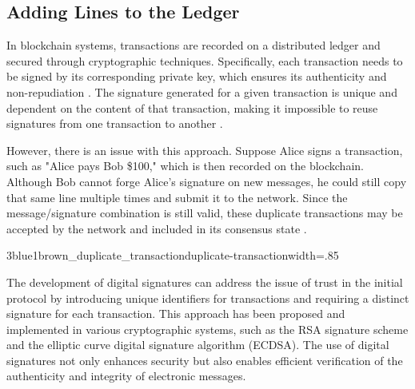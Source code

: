 \subsection{Adding Lines to the Ledger}
In blockchain systems, transactions are recorded on a distributed ledger and secured through cryptographic techniques. Specifically, each
transaction needs to be signed by its corresponding private key, which ensures its authenticity and non-repudiation
\cite{stinson2018cryptography}. The signature generated for a given transaction is unique and dependent on the content of that transaction,
making it impossible to reuse signatures from one transaction to another \cite{bruce1996applied}.

However, there is an issue with this approach. Suppose Alice signs a transaction, such as "Alice pays Bob \$100," which is then recorded on
the blockchain. Although Bob cannot forge Alice's signature on new messages, he could still copy that same line multiple times and submit it
to the network. Since the message/signature combination is still valid, these duplicate transactions may be accepted by the network and
included in its consensus state \cite{swan2015blockchain}.

{3blue1brown_duplicate_transaction}{duplicate-transaction}{width=.85\textwidth}%

The development of digital signatures can address the issue of trust in the initial protocol by introducing unique identifiers for transactions
and requiring a distinct signature for each transaction. This approach has been proposed and implemented in various cryptographic systems,
such as the RSA signature scheme \cite{rivest1978method} and the elliptic curve digital signature algorithm (ECDSA). The use of digital
signatures not only enhances security but also enables efficient verification of the authenticity and integrity of electronic messages.
